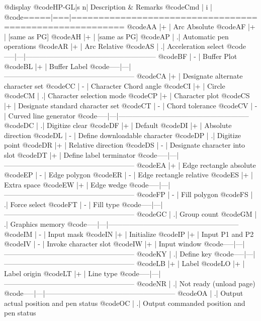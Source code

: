 @display
@code{HP-GL|s n| Description & Remarks}
@code{Cmd  | i |}
@code{=====|===|========================================================}
@code{AA   |+  | Arc Absolute}
@code{AF   |+  | [same as PG]}
@code{AH   |+  | [same as PG]}
@code{AP   |  .| Automatic pen operations}
@code{AR   |+  | Arc Relative}
@code{AS   |  .| Acceleration select}
@code{-----|---|--------------------------------------------------------}
@code{BF   | - | Buffer Plot}
@code{BL   |+  | Buffer Label}
@code{-----|---|--------------------------------------------------------}
@code{CA   |+  | Designate alternate character set}
@code{CC   | - | Character Chord angle}
@code{CI   |+  | Circle}
@code{CM   |  .| Character selection mode}
@code{CP   |+  | Character plot}
@code{CS   |+  | Designate standard character set}
@code{CT   | - | Chord tolerance}
@code{CV   | - | Curved line generator}
@code{-----|---|--------------------------------------------------------}
@code{DC   |  .| Digitize clear}
@code{DF   |+  | Default}
@code{DI   |+  | Absolute direction}
@code{DL   | - | Define downloadable character}
@code{DP   |  .| Digitize point}
@code{DR   |+  | Relative direction}
@code{DS   | - | Designate character into slot}
@code{DT   |+  | Define label terminator}
@code{-----|---|--------------------------------------------------------}
@code{EA   |+  | Edge rectangle absolute}
@code{EP   | - | Edge polygon}
@code{ER   | - | Edge rectangle relative}
@code{ES   |+  | Extra space}
@code{EW   |+  | Edge wedge}
@code{-----|---|--------------------------------------------------------}
@code{FP   | - | Fill polygon}
@code{FS   |  .| Force select}
@code{FT   | - | Fill type}
@code{-----|---|--------------------------------------------------------}
@code{GC   |  .| Group count}
@code{GM   |  .| Graphics memory}
@code{-----|---|--------------------------------------------------------}
@code{IM   | - | Input mask}
@code{IN   |+  | Initialize}
@code{IP   |+  | Input P1 and P2}
@code{IV   | - | Invoke character slot}
@code{IW   |+  | Input window}
@code{-----|---|--------------------------------------------------------}
@code{KY   |  .| Define key}
@code{-----|---|--------------------------------------------------------}
@code{LB   |+  | Label}
@code{LO   |+  | Label origin}
@code{LT   |+  | Line type}
@code{-----|---|--------------------------------------------------------}
@code{NR   |  .| Not ready (unload page)}
@code{-----|---|--------------------------------------------------------}
@code{OA   |  .| Output actual position and pen status}
@code{OC   |  .| Output commanded position and pen status}
